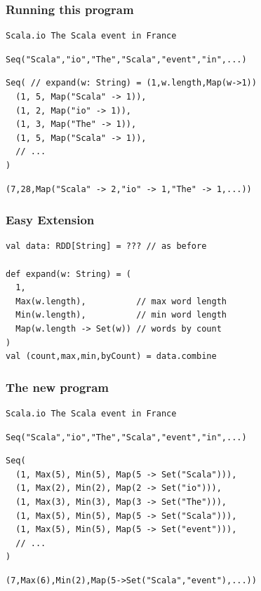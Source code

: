 \documentclass{beamer}
\begin{document}
\begin{frame}[fragile]
  \frametitle{Running this program}
\begin{verbatim}
Scala.io The Scala event in France
\end{verbatim}
\begin{verbatim}
Seq("Scala","io","The","Scala","event","in",...)
\end{verbatim}
\begin{verbatim}
Seq( // expand(w: String) = (1,w.length,Map(w->1))
  (1, 5, Map("Scala" -> 1)),
  (1, 2, Map("io" -> 1)),
  (1, 3, Map("The" -> 1)),
  (1, 5, Map("Scala" -> 1)),
  // ...
)
\end{verbatim}
\begin{verbatim}
(7,28,Map("Scala" -> 2,"io" -> 1,"The" -> 1,...))
\end{verbatim}
\end{frame}

\begin{frame}[fragile]
  \frametitle{Easy Extension}
\begin{verbatim}
val data: RDD[String] = ??? // as before

def expand(w: String) = (
  1,
  Max(w.length),          // max word length
  Min(w.length),          // min word length
  Map(w.length -> Set(w)) // words by count
)
val (count,max,min,byCount) = data.combine
\end{verbatim}
\end{frame}

\begin{frame}[fragile]
  \frametitle{The new program}
\begin{verbatim}
Scala.io The Scala event in France
\end{verbatim}
\begin{verbatim}
Seq("Scala","io","The","Scala","event","in",...)
\end{verbatim}
\begin{verbatim}
Seq(
  (1, Max(5), Min(5), Map(5 -> Set("Scala"))),
  (1, Max(2), Min(2), Map(2 -> Set("io"))),
  (1, Max(3), Min(3), Map(3 -> Set("The"))),
  (1, Max(5), Min(5), Map(5 -> Set("Scala"))),
  (1, Max(5), Min(5), Map(5 -> Set("event"))),
  // ...
)
\end{verbatim}
\begin{verbatim}
(7,Max(6),Min(2),Map(5->Set("Scala","event"),...))
\end{verbatim}
\end{frame}
\end{document}
